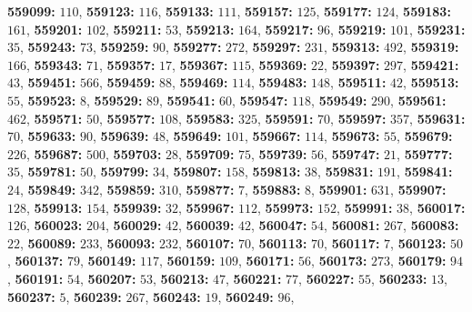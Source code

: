 \textsf{\bfseries 559099:} $110$, \textsf{\bfseries 559123:} $116$, \textsf{\bfseries 559133:} $111$, \textsf{\bfseries 559157:} $125$, \textsf{\bfseries 559177:} $124$, \textsf{\bfseries 559183:} $161$, \textsf{\bfseries 559201:} $102$, \textsf{\bfseries 559211:} $53$, \textsf{\bfseries 559213:} $164$, \textsf{\bfseries 559217:} $96$, \textsf{\bfseries 559219:} $101$, \textsf{\bfseries 559231:} $35$, \textsf{\bfseries 559243:} $73$, \textsf{\bfseries 559259:} $90$, \textsf{\bfseries 559277:} $272$, \textsf{\bfseries 559297:} $231$, \textsf{\bfseries 559313:} $492$, \textsf{\bfseries 559319:} $166$, \textsf{\bfseries 559343:} $71$, \textsf{\bfseries 559357:} $17$, \textsf{\bfseries 559367:} $115$, \textsf{\bfseries 559369:} $22$, \textsf{\bfseries 559397:} $297$, \textsf{\bfseries 559421:} $43$, \textsf{\bfseries 559451:} $566$, \textsf{\bfseries 559459:} $88$, \textsf{\bfseries 559469:} $114$, \textsf{\bfseries 559483:} $148$, \textsf{\bfseries 559511:} $42$, \textsf{\bfseries 559513:} $55$, \textsf{\bfseries 559523:} $8$, \textsf{\bfseries 559529:} $89$, \textsf{\bfseries 559541:} $60$, \textsf{\bfseries 559547:} $118$, \textsf{\bfseries 559549:} $290$, \textsf{\bfseries 559561:} $462$, \textsf{\bfseries 559571:} $50$, \textsf{\bfseries 559577:} $108$, \textsf{\bfseries 559583:} $325$, \textsf{\bfseries 559591:} $70$, \textsf{\bfseries 559597:} $357$, \textsf{\bfseries 559631:} $70$, \textsf{\bfseries 559633:} $90$, \textsf{\bfseries 559639:} $48$, \textsf{\bfseries 559649:} $101$, \textsf{\bfseries 559667:} $114$, \textsf{\bfseries 559673:} $55$, \textsf{\bfseries 559679:} $226$, \textsf{\bfseries 559687:} $500$, \textsf{\bfseries 559703:} $28$, \textsf{\bfseries 559709:} $75$, \textsf{\bfseries 559739:} $56$, \textsf{\bfseries 559747:} $21$, \textsf{\bfseries 559777:} $35$, \textsf{\bfseries 559781:} $50$, \textsf{\bfseries 559799:} $34$, \textsf{\bfseries 559807:} $158$, \textsf{\bfseries 559813:} $38$, \textsf{\bfseries 559831:} $191$, \textsf{\bfseries 559841:} $24$, \textsf{\bfseries 559849:} $342$, \textsf{\bfseries 559859:} $310$, \textsf{\bfseries 559877:} $7$, \textsf{\bfseries 559883:} $8$, \textsf{\bfseries 559901:} $631$, \textsf{\bfseries 559907:} $128$, \textsf{\bfseries 559913:} $154$, \textsf{\bfseries 559939:} $32$, \textsf{\bfseries 559967:} $112$, \textsf{\bfseries 559973:} $152$, \textsf{\bfseries 559991:} $38$, \textsf{\bfseries 560017:} $126$, \textsf{\bfseries 560023:} $204$, \textsf{\bfseries 560029:} $42$, \textsf{\bfseries 560039:} $42$, \textsf{\bfseries 560047:} $54$, \textsf{\bfseries 560081:} $267$, \textsf{\bfseries 560083:} $22$, \textsf{\bfseries 560089:} $233$, \textsf{\bfseries 560093:} $232$, \textsf{\bfseries 560107:} $70$, \textsf{\bfseries 560113:} $70$, \textsf{\bfseries 560117:} $7$, \textsf{\bfseries 560123:} $50$, \textsf{\bfseries 560137:} $79$, \textsf{\bfseries 560149:} $117$, \textsf{\bfseries 560159:} $109$, \textsf{\bfseries 560171:} $56$, \textsf{\bfseries 560173:} $273$, \textsf{\bfseries 560179:} $94$, \textsf{\bfseries 560191:} $54$, \textsf{\bfseries 560207:} $53$, \textsf{\bfseries 560213:} $47$, \textsf{\bfseries 560221:} $77$, \textsf{\bfseries 560227:} $55$, \textsf{\bfseries 560233:} $13$, \textsf{\bfseries 560237:} $5$, \textsf{\bfseries 560239:} $267$, \textsf{\bfseries 560243:} $19$, \textsf{\bfseries 560249:} $96$, 
